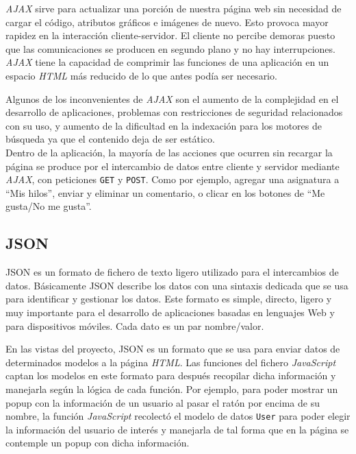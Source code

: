 \documentclass[a4paper, 12pt]{book}
\begin{document}
\textit{AJAX} sirve para actualizar una porci\'on de nuestra p\'agina web sin necesidad de cargar el c\'odigo, atributos gr\'aficos e im\'agenes de nuevo. Esto
provoca mayor rapidez en la interacci\'on cliente-servidor. El cliente no percibe demoras puesto que las comunicaciones se producen en segundo plano y
no hay interrupciones. \textit{AJAX} tiene la capacidad de comprimir las funciones de una aplicaci\'on en un espacio \textit{HTML} m\'as reducido de lo que antes pod\'ia
ser necesario.

Algunos de los inconvenientes de \textit{AJAX} son el aumento de la complejidad en el desarrollo de aplicaciones, problemas con restricciones de seguridad 
relacionados con su uso, y aumento de la dificultad en la indexaci\'on para los motores de b\'usqueda ya que el contenido deja de ser est\'atico.\\

Dentro de la aplicaci\'on, la mayor\'ia de las acciones que ocurren sin recargar la p\'agina se produce por el intercambio de datos entre cliente y servidor 
mediante \textit{AJAX}, con peticiones \texttt{GET} y \texttt{POST}. Como por ejemplo, agregar una asignatura a ``Mis hilos'', enviar y eliminar un 
comentario, o clicar en los botones de ``Me gusta/No me gusta''.


\subsection{JSON}
\label{subsec:json}
JSON es un formato de fichero de texto ligero utilizado para el intercambios de datos. B\'asicamente JSON describe los datos con una sintaxis dedicada 
que se usa para identificar y gestionar los datos. Este formato es simple, directo, ligero y muy importante para el desarrollo de aplicaciones basadas 
en lenguajes Web y para dispositivos m\'oviles. Cada dato es un par nombre/valor.

En las vistas del proyecto, JSON es un formato que se usa para enviar datos de determinados modelos a la p\'agina \textit{HTML}. Las funciones del fichero 
\textit{JavaScript} captan los modelos en este formato para despu\'es recopilar dicha informaci\'on y manejarla seg\'un la l\'ogica de cada funci\'on. Por 
ejemplo, para poder mostrar un popup con la informaci\'on de un usuario al pasar el rat\'on por encima de su nombre, la funci\'on \textit{JavaScript} 
recolect\'o el modelo de datos \texttt{User} para poder elegir la informaci\'on del usuario de inter\'es y manejarla de tal forma que en la p\'agina se 
contemple un popup con dicha informaci\'on.
\end{document}
